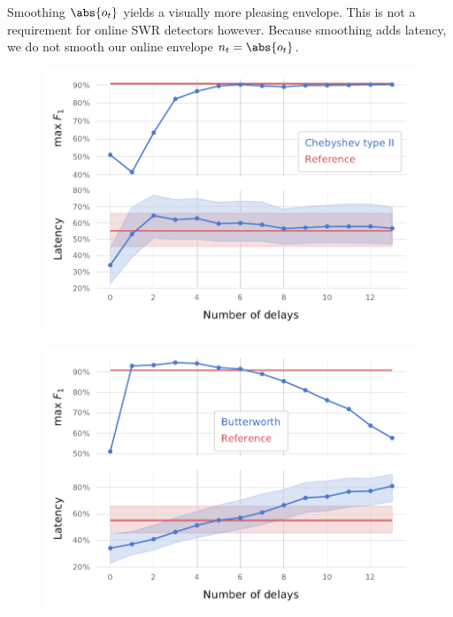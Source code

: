 Smoothing $\abs{o_t}$ yields a visually more pleasing envelope. This is not a requirement for online SWR detectors however. Because smoothing adds latency, we do not smooth our online envelope $n_t = \abs{o_t}$.










\clearpage
\begin{figure}
\includegraphics{figures/searcharray-cheby2}
\end{figure}

\begin{figure}
\includegraphics{figures/searcharray-butter}
\end{figure}
